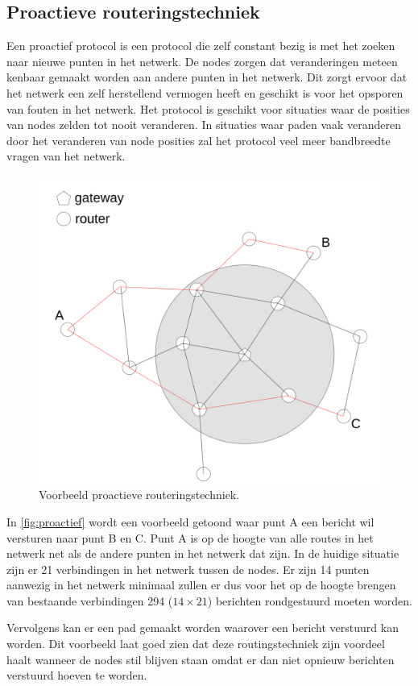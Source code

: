 \documentclass[a4paper, 11pt, oneside]{report}
\begin{document}
\subsection{Proactieve routeringstechniek}
\label{sec:meshnetwerktechniek:proactief}

Een proactief protocol is een protocol die zelf constant bezig is met het zoeken naar nieuwe punten in het netwerk.
De nodes zorgen dat veranderingen meteen kenbaar gemaakt worden aan andere punten in het netwerk. 
Dit zorgt ervoor dat het netwerk een zelf herstellend vermogen heeft en geschikt is voor het opsporen van fouten in het netwerk.
Het protocol is geschikt voor situaties waar de posities van nodes zelden tot nooit veranderen. 
In situaties waar paden vaak veranderen door het veranderen van node posities zal het protocol veel meer bandbreedte vragen van het netwerk. 

\begin{figure}[H]
	\begin{center}\includegraphics[width=0.45\linewidth]{Afbeeldingen/proactive.png}\end{center}
	\caption{Voorbeeld proactieve routeringstechniek.}
	\label{fig:proactief}
\end{figure}

In \autoref{fig:proactief} wordt een voorbeeld getoond waar punt A een bericht wil versturen naar punt B en C. 
Punt A is op de hoogte van alle routes in het netwerk net als de andere punten in het netwerk dat zijn.
In de huidige situatie zijn er 21 verbindingen in het netwerk tussen de nodes.
Er zijn 14 punten aanwezig in het netwerk minimaal zullen er dus voor het op de hoogte brengen van bestaande verbindingen 294 ($14 \times 21$) berichten rondgestuurd moeten worden. 

Vervolgens kan er een pad gemaakt worden waarover een bericht verstuurd kan worden.
Dit voorbeeld laat goed zien dat deze routingstechniek zijn voordeel haalt wanneer de nodes stil blijven staan omdat er dan niet opnieuw berichten verstuurd hoeven te worden. 
 
\end{document}
